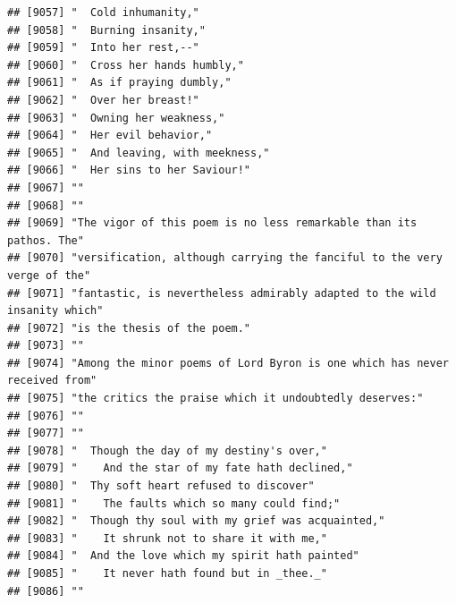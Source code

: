 \documentclass{article}\usepackage[]{graphicx}\usepackage[]{color}
\makeatletter
\newenvironment{kframe}{%
 \def\at@end@of@kframe{}%
 \ifinner\ifhmode%
  \def\at@end@of@kframe{\end{minipage}}%
  \begin{minipage}{\columnwidth}%
 \fi\fi%
 \def\FrameCommand##1{\hskip\@totalleftmargin \hskip-\fboxsep
 \colorbox{shadecolor}{##1}\hskip-\fboxsep
     \hskip-\linewidth \hskip-\@totalleftmargin \hskip\columnwidth}%
 \MakeFramed {\advance\hsize-\width
   \@totalleftmargin\z@ \linewidth\hsize
   \@setminipage}}%
 {\par\unskip\endMakeFramed%
 \at@end@of@kframe}
\newenvironment{knitrout}{}{} %
\makeatother
\begin{document}
\begin{knitrout}
\begin{kframe}
\begin{verbatim}
## [9057] "  Cold inhumanity,"                                                          
## [9058] "  Burning insanity,"                                                         
## [9059] "  Into her rest,--"                                                          
## [9060] "  Cross her hands humbly,"                                                   
## [9061] "  As if praying dumbly,"                                                     
## [9062] "  Over her breast!"                                                          
## [9063] "  Owning her weakness,"                                                      
## [9064] "  Her evil behavior,"                                                        
## [9065] "  And leaving, with meekness,"                                               
## [9066] "  Her sins to her Saviour!"                                                  
## [9067] ""                                                                            
## [9068] ""                                                                            
## [9069] "The vigor of this poem is no less remarkable than its pathos. The"           
## [9070] "versification, although carrying the fanciful to the very verge of the"      
## [9071] "fantastic, is nevertheless admirably adapted to the wild insanity which"     
## [9072] "is the thesis of the poem."                                                  
## [9073] ""                                                                            
## [9074] "Among the minor poems of Lord Byron is one which has never received from"    
## [9075] "the critics the praise which it undoubtedly deserves:"                       
## [9076] ""                                                                            
## [9077] ""                                                                            
## [9078] "  Though the day of my destiny's over,"                                      
## [9079] "    And the star of my fate hath declined,"                                  
## [9080] "  Thy soft heart refused to discover"                                        
## [9081] "    The faults which so many could find;"                                    
## [9082] "  Though thy soul with my grief was acquainted,"                             
## [9083] "    It shrunk not to share it with me,"                                      
## [9084] "  And the love which my spirit hath painted"                                 
## [9085] "    It never hath found but in _thee._"                                      
## [9086] ""                                                                            

\end{verbatim}
\end{kframe}
\end{knitrout}
\end{document}
